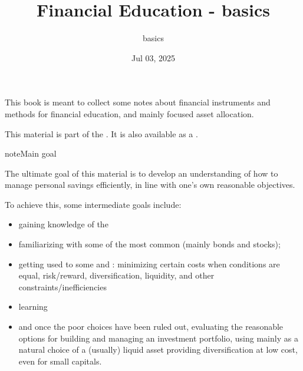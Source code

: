 \documentclass[letterpaper,10pt,english]{jupyterBook}
\title{Financial Education - basics}
\date{Jul 03, 2025}
\author{basics}
\begin{document}
\pagestyle{empty}
\sphinxmaketitle
\pagestyle{plain}
\sphinxtableofcontents
\pagestyle{normal}
\label{\detokenize{intro::doc}}


\sphinxAtStartPar
This book is meant to collect some notes about financial instruments and methods for financial education, and mainly focused asset allocation.

\sphinxAtStartPar
This material is part of the . It is also available as a .

\begin{sphinxadmonition}{note}{Main goal}

\sphinxAtStartPar
The ultimate goal of this material is to develop an understanding of how to manage personal savings efficiently, in line with one’s own reasonable objectives.

\sphinxAtStartPar
To achieve this, some intermediate goals include:
\begin{itemize}
\item {} 
\sphinxAtStartPar
gaining knowledge of the 

\item {} 
\sphinxAtStartPar
familiarizing with some of the most common  (mainly bonds and stocks);

\item {} 
\sphinxAtStartPar
getting used to some  and : minimizing certain costs when conditions are equal, risk/reward, diversification, liquidity, and other constraints/inefficiencies

\item {} 
\sphinxAtStartPar
learning 

\item {} 
\sphinxAtStartPar
and once the poor choices have been ruled out, evaluating the reasonable options for building and managing an investment portfolio, using mainly {\hyperref[\detokenize{ch/assets/etfs:fin-edu-assets-etfs}]{}} as a natural choice of a (usually) liquid asset providing diversification at low cost, even for small capitals.

\end{itemize}
\end{sphinxadmonition}
\end{document}
